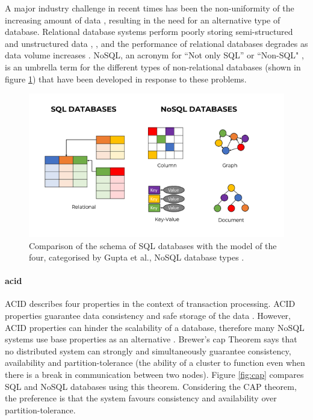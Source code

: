 A major industry challenge in recent times has been the non-uniformity of the increasing amount of data \cite{Gupta}, resulting in the need for an alternative type of database. Relational database systems perform poorly storing semi-structured and unstructured data \cite{Gupta}, \cite{Li}, and the performance of relational databases degrades as data volume increases \cite{Nayak}. NoSQL, an acronym for ``Not only SQL” or ``Non-SQL" \cite{Cure}, is an umbrella term for the different types of non-relational databases (shown in figure \ref{fig:dbtypes}) that have been developed in response to these problems.

\FloatBarrier
\begin{figure}[H]
\centering
\includegraphics[width=\textwidth]{7design/images/nosqlDBs.png}
\caption{Comparison of the schema of SQL databases with the model of the four, categorised by Gupta et al., NoSQL database types \cite{Sahoo}.}
\label{fig:dbtypes}
\end{figure}

\paragraph{\gls{acid}} ACID describes four properties in the context of transaction processing. ACID properties guarantee data consistency and safe storage of the data \cite{Hauser} \cite{Foote}. However, ACID properties can hinder the scalability of a database, therefore many NoSQL systems use \gls{base} properties as an alternative \cite{Sundhara} \cite{Tang}. Brewer's \gls{cap} Theorem \cite{captheorem} \cite{Lynch} says that no distributed system can strongly and simultaneously guarantee consistency, availability and partition-tolerance (the ability of a cluster to function even when there is a break in communication between two nodes). Figure \ref{fig:cap} compares SQL and NoSQL databases using this theorem. Considering the CAP theorem, the preference is that the system favours consistency and availability over partition-tolerance. 

